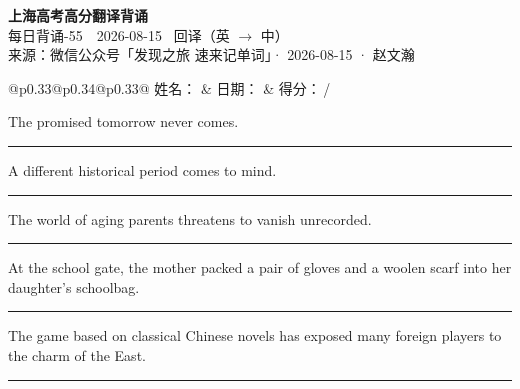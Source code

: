 \documentclass[11pt,a4paper]{article}
\newcommand{\num}[1]{\makebox[1.9em][r]{#1.}\hspace{0.3em}}
\newcommand{\wline}{\noindent\rule{\linewidth}{0.4pt}}
\begin{document}
\pagestyle{plain}
\begin{center}
{\LARGE\bfseries 上海高考高分翻译背诵 }\\[0.25em]
{\large 每日背诵-55　2026-08-15 \quad\ 回译（英 $\to$ 中）}\\[0.35em]
{\footnotesize 来源：微信公众号「发现之旅 速来记单词」· 2026-08-15 · 赵文瀚}
\end{center}

\vspace{0.4em}
\noindent\begin{tabular}{@{}p{0.33\textwidth}@{}p{0.34\textwidth}@{}p{0.33\textwidth}@{}}
姓名：\underline{\hspace{2.0cm}} & 日期：\underline{\hspace{2.0cm}} & 得分：\underline{\hspace{1.4cm}}\,/ \\
\end{tabular}

\vspace{0.5em}

\vspace{0.8em}
\num{1}The promised tomorrow never comes.

\vspace{0.25em}

\wline

\num{2}A different historical period comes to mind.

\vspace{0.25em}

\wline

\num{3}The world of aging parents threatens to vanish unrecorded.

\vspace{0.25em}

\wline

\num{4}At the school gate, the mother packed a pair of gloves and a woolen scarf into her daughter’s schoolbag.

\vspace{0.25em}

\wline

\num{5}The game based on classical Chinese novels has exposed many foreign players to the charm of the East.

\vspace{0.25em}

\wline
\end{document}
